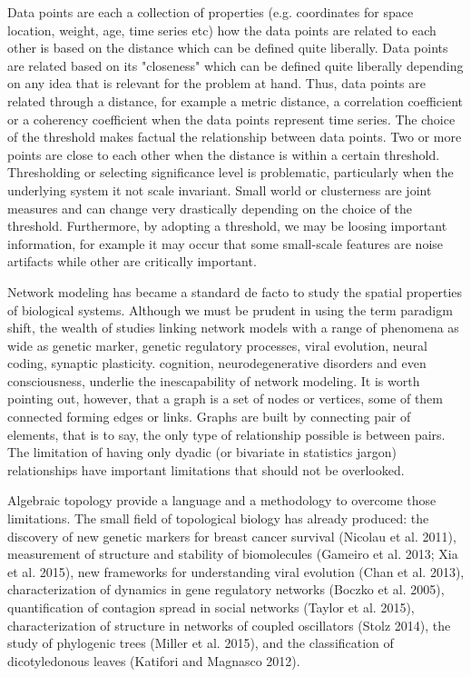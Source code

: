 \documentclass[onecollarge,runningheads]{svjour2}
\begin{document}
Data points are each a collection of properties (e.g. coordinates for space location, weight, age, time series etc) how the data points are related to each other is based on the distance which can be defined quite liberally. 
Data points are related based on its "closeness" which can be defined quite liberally depending on any idea that is relevant for the problem at hand. Thus, data points are related through a distance, for example a metric distance, a correlation coefficient or a coherency coefficient when the data points represent time series. The choice of the threshold makes factual the relationship between data points. Two or more points are close to each other when the distance is within a certain threshold. 
Thresholding or selecting significance level is problematic, particularly when the underlying system it not scale invariant. Small world or clusterness are joint measures and can change very drastically depending on the choice of the threshold. Furthermore, by adopting a threshold, we may be loosing important information, for example it may occur that some small-scale features are noise artifacts while other are critically important.  

Network modeling has became a standard de facto to study the spatial properties of biological systems. 
Although we must be prudent in using the term paradigm shift, the wealth of studies linking network models with a range of phenomena as wide as genetic marker, genetic regulatory processes, viral evolution, neural coding, synaptic plasticity. cognition, neurodegenerative disorders and even consciousness, underlie the inescapability of network modeling.  
It is worth pointing out, however, that a graph is a set of nodes or vertices, some of them connected forming edges or links. Graphs are built by connecting pair of elements, that is to say, the only type of relationship possible is between pairs. The limitation of having only dyadic (or bivariate in statistics jargon) relationships have important limitations that should not be overlooked.

Algebraic topology provide a language and a methodology to overcome those limitations.
The small field of topological biology has already produced: the discovery of new genetic markers for breast cancer survival (Nicolau et al. 2011), measurement of structure and stability of biomolecules (Gameiro et al. 2013; Xia et al. 2015), new frameworks for understanding viral evolution (Chan et al. 2013), characterization of dynamics in gene regulatory networks (Boczko et al. 2005), quantification of contagion spread in social networks (Taylor et al. 2015), characterization of structure in networks of coupled oscillators (Stolz 2014), the study of phylogenic trees (Miller et al. 2015), and the classification of dicotyledonous leaves (Katifori and Magnasco 2012). 
\end{document}
